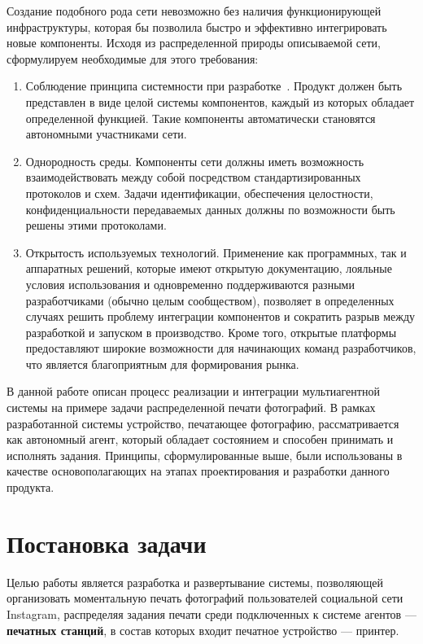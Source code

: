 \documentclass[a4paper,14pt,href,draft]{article}
\begin{document}
Создание подобного рода сети невозможно без наличия функционирующей инфраструктуры, которая бы позволила быстро
и эффективно интегрировать новые компоненты. Исходя из распределенной природы описываемой сети, сформулируем необходимые
для этого требования:

\begin{enumerate}
  \item Соблюдение принципа системности при разработке~\cite{SystemPrinciple}. Продукт должен быть представлен в виде
  целой системы компонентов, каждый из которых обладает определенной функцией. Такие компоненты автоматически становятся
  автономными участниками сети.

  \item Однородность среды. Компоненты сети должны иметь возможность взаимодействовать между собой посредством
  стандартизированных протоколов и схем. Задачи идентификации, обеспечения целостности, конфиденциальности передаваемых
  данных должны по возможности быть решены этими протоколами.

  \item Открытость используемых технологий. Применение как программных, так и аппаратных решений, которые имеют
  открытую документацию, лояльные  условия использования и одновременно поддерживаются разными разработчиками
  (обычно целым сообществом), позволяет в определенных случаях решить проблему интеграции компонентов и сократить разрыв
  между разработкой и запуском в производство. Кроме того, открытые платформы предоставляют широкие возможности для
  начинающих команд разработчиков, что является благоприятным для формирования рынка.
\end{enumerate}

В данной работе описан процесс реализации и интеграции муль\-тиагентной системы на примере задачи распределенной
печати фотографий. В рамках разработанной системы устройство, печатающее фотографию, рассматривается как автономный
агент, который обладает состоянием и способен принимать и исполнять задания. Принципы, сформулированные выше, были
использованы в качестве основополагающих на этапах проектирования и разработки данного продукта.

\newpage
\section*{Постановка задачи}
Целью работы является разработка и развертывание системы, позволяющей организовать моментальную печать фотографий
пользователей социальной сети Instagram, распределяя задания печати среди подключенных к системе агентов ---
\textbf{печатных станций}, в состав которых входит печатное устройство --- принтер.
\end{document}
